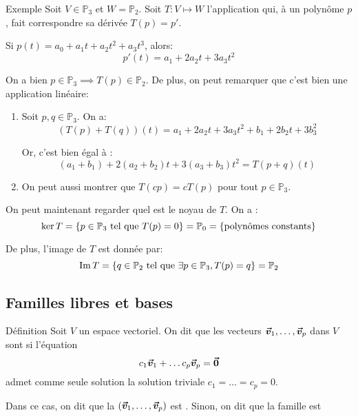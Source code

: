 \documentclass[a4paper]{article}
\begin{document}
\begin{parag}{Exemple}
    Soit $V \in \mathbb{P}_3$ et $W = \mathbb{P}_2$. Soit $T : V \mapsto W$ l'application qui, à un polynôme $p$, fait correspondre sa dérivée $T\left(p\right) = p'$.

    Si $p\left(t\right) = a_0 + a_1 t + a_2 t^2 + a_3 t^3$, alors:
    \[p'\left(t\right) = a_1 + 2a_2 t + 3a_3 t^2\]

    On a bien $p \in \mathbb{P}_3 \implies T\left(p\right) \in \mathbb{P}_2$. De plus, on peut remarquer que c'est bien une application linéaire:
    \begin{enumerate}
        \item Soit $p, q \in \mathbb{P}_3$. On a:
        \[\left(T\left(p\right) + T\left(q\right)\right)\left(t\right) = a_1 + 2a_2 t + 3a_3 t^2 + b_1 + 2b_2 t + 3b_3^2\]

        Or, c'est bien égal à :
        \[\left(a_1 + b_1\right) + 2\left(a_2 + b_2\right)t + 3\left(a_3 + b_3\right)t^2 = T\left(p + q\right)\left(t\right)\]
        \item On peut aussi montrer que $T\left(cp\right) = cT\left(p\right)$ pour tout $p \in \mathbb{P}_3$.

    \end{enumerate}

    On peut maintenant regarder quel est le noyau de $T$. On a :
    \[\ker T = \left\{p \in \mathbb{P}_3 \telque T\left(p\right) = 0\right\} = \mathbb{P}_0 = \left\{\text{polynômes constants}\right\}\]

    De plus, l'image de $T$ est donnée par:
    \[\im T = \left\{q \in \mathbb{P}_2 \telque \exists p \in \mathbb{P}_3, T\left(p\right) = q\right\} = \mathbb{P}_2\]

\end{parag}

\subsection{Familles libres et bases}
\begin{parag}{Définition}
    Soit $V$ un espace vectoriel. On dit que les vecteurs $\bm{\protect\vec{v}}_1, \ldots, \bm{\protect\vec{v}}_p$ dans $V$ sont  si l'équation
    \[c_1 \bm{\protect\vec{v}}_1 + \ldots c_p \bm{\protect\vec{v}}_p = \bm{\protect\vec{0}}\]
    admet comme seule solution la solution triviale $c_1 = \ldots = c_p = 0$.

    Dans ce cas, on dit que la  $\left(\bvec{v}_1, \ldots, \bvec{v}_p\right)$ est . Sinon, on dit que la famille est 
\end{parag}
\end{document}
